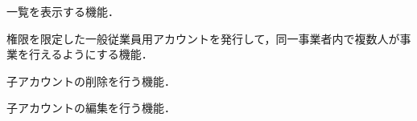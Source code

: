 \documentclass[a4paper, titlepage]{jsarticle}
\begin{document}
\begin{description}[labelwidth=\linewidth]



  \item [子アカウント一覧表示機能] 一覧を表示する機能．
  \item [子アカウント発行機能] 権限を限定した一般従業員用アカウントを発行して，同一事業者内で複数人が事業を行えるようにする機能．
  \item [子アカウント削除機能] 子アカウントの削除を行う機能．
  \item [子アカウント編集機能] 子アカウントの編集を行う機能．


\end{description}
\end{document}
